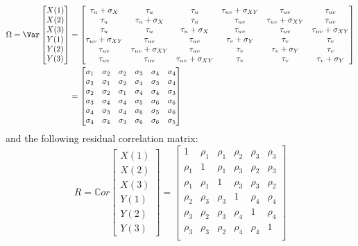 \documentclass[12pt]{article}
\begin{document}
\begin{align*}
\Omega = \Var\begin{bmatrix}X(1) \\ X(2) \\ X(3) \\ Y(1) \\ Y(2) \\ Y(3) \end{bmatrix}
&= \begin{bmatrix}
\tau_u + \sigma_X & \tau_u & \tau_u & \tau_{uv} + \sigma_{XY} & \tau_{uv} & \tau_{uv} \\
\tau_u & \tau_u + \sigma_X & \tau_u & \tau_{uv} & \tau_{uv} + \sigma_{XY} & \tau_{uv} \\
\tau_u & \tau_u & \tau_u + \sigma_X & \tau_{uv} & \tau_{uv} & \tau_{uv} + \sigma_{XY} \\
\tau_{uv} + \sigma_{XY} & \tau_{uv}  & \tau_{uv} & \tau_v + \sigma_Y & \tau_v & \tau_v \\
\tau_{uv} & \tau_{uv} + \sigma_{XY} & \tau_{uv}  & \tau_v & \tau_v + \sigma_Y & \tau_v \\
\tau_{uv} & \tau_{uv} & \tau_{uv} + \sigma_{XY}  & \tau_v & \tau_v & \tau_v + \sigma_Y  \\
\end{bmatrix} \\
&= \begin{bmatrix}
\sigma_1 & \sigma_2 & \sigma_2 & \sigma_3 & \sigma_4 & \sigma_4 \\
\sigma_2 & \sigma_1 & \sigma_2 & \sigma_4 & \sigma_3 & \sigma_4 \\
\sigma_2 & \sigma_2 & \sigma_1 & \sigma_4 & \sigma_4 & \sigma_3 \\
\sigma_3 & \sigma_4 & \sigma_4 & \sigma_5 & \sigma_6 & \sigma_6 \\
\sigma_4 & \sigma_3 & \sigma_4 & \sigma_6 & \sigma_5 & \sigma_6 \\
\sigma_4 & \sigma_4 & \sigma_3 & \sigma_6 & \sigma_6 & \sigma_5  \\
\end{bmatrix}
\end{align*}
and the following residual correlation matrix:
\[ R = \mathbb{C}or\begin{bmatrix}X(1) \\ X(2) \\ X(3) \\ Y(1) \\ Y(2) \\ Y(3) \end{bmatrix}
= \begin{bmatrix}
1      & \rho_1 & \rho_1 & \rho_2 & \rho_3 & \rho_3 \\
\rho_1 & 1      & \rho_1 & \rho_3 & \rho_2 & \rho_3 \\
\rho_1 & \rho_1 & 1      & \rho_3 & \rho_3 & \rho_2 \\
\rho_2 & \rho_3 & \rho_3 & 1      & \rho_4 & \rho_4 \\
\rho_3 & \rho_2 & \rho_3 & \rho_4 & 1      & \rho_4 \\
\rho_3 & \rho_3 & \rho_2 & \rho_4 & \rho_4 & 1  \\
\end{bmatrix}
\]
\end{document}
